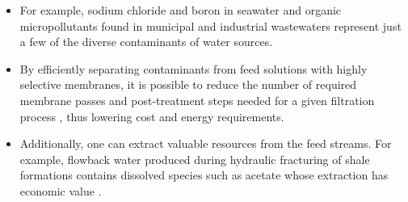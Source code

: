 \documentclass{article}
\begin{document}
  \begin{itemize}
    \item For example, sodium chloride and boron in seawater 
    \cite{fritzmann_state---art_2007} and organic micropollutants found in
    municipal and industrial wastewaters \cite{schwarzenbach_challenge_2006}
    represent just a few of the diverse contaminants of water sources. 
    \item By efficiently separating contaminants from feed solutions with
    highly selective membranes, it is possible to reduce the number of 
    required membrane passes and post-treatment steps needed for a given 
    filtration process \cite{werber_materials_2016}, thus lowering cost
    and energy requirements. 
    \item Additionally, one can extract valuable resources from the 
    feed streams. For example, flowback water produced during hydraulic
    fracturing of shale formations contains dissolved species such as acetate
    whose extraction has economic value \cite{dischinger_application_2017}.
  \end{itemize}
\end{document}
